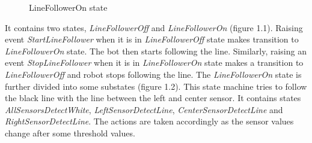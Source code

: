 \documentclass[a4paper,12pt,oneside]{book}
\begin{document}
\begin{itemize}
\begin{figure}[!htbp]
\begin{minipage}{0.45\textwidth}
	\caption{LineFollowerOn state}
\end{minipage}
\end{figure}
It contains two states, \textit{LineFollowerOff} and \textit{LineFollowerOn} (figure 1.1). Raising event \textit{StartLineFollower} when it is in \textit{LineFollowerOff} state makes transition to \textit{LineFollowerOn} state. 
The bot then starts following the line. Similarly, raising an event \textit{StopLineFollower} when it is in \textit{LineFollowerOn} state makes a transition to \textit{LineFollowerOff} and robot stops following the line.
The \textit{LineFollowerOn} state is further divided into some substates (figure 1.2). This state machine tries to follow the black line with the line between the left and center sensor. It contains states \textit{AllSensorsDetectWhite}, \textit{LeftSensorDetectLine}, \textit{CenterSensorDetectLine} and \textit{RightSensorDetectLine}. The actions are taken accordingly as the sensor values change after some threshold values.


\end{itemize}
\end{document}
